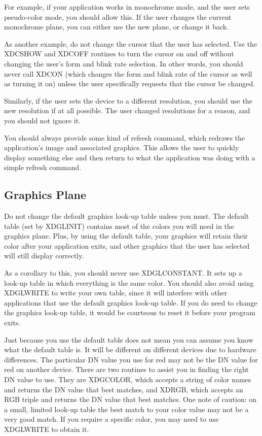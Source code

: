 For example, if your application works in monochrome mode, and the
user sets pseudo-color mode, you should allow this.  If the user changes
the current monochrome plane, you can either use the new plane, or
change it back.

As another example, do not change the cursor that the user has selected.
Use the XDCSHOW and XDCOFF routines to turn the cursor on and off
without changing the user's form and blink rate selection.  In other
words, you should never call XDCON (which changes the form and blink
rate of the cursor as well as turning it on) unless the user specifically
requests that the cursor be changed.

Similarly, if the user sets the device to a different resolution, you
should use the new resolution if at all possible.  The user
changed resolutions for a reason, and you should not ignore it.

You should always provide some kind of refresh command, which redraws the
application's image and associated graphics.  This allows the user to
quickly display something else and then return to what the application
was doing with a simple refresh command.
\subsection{Graphics Plane}
Do not change the default graphics look-up table unless you must.  The
default table (set by XDGLINIT) contains most of the colors you
will need in the graphics plane.  Plus, by using the default table,
your graphics will retain their color after your application exits, and
other graphics that the user has selected will still display correctly.

As a corollary to this, you should never use XDGLCONSTANT.  It sets up
a look-up table in which everything is the same color.  You should also
avoid using XDGLWRITE to write your own table, since
it will interfere with other applications that use the default graphics
look-up table.  If you do need to change the graphics look-up table,
it would be courteous to reset it before your program exits.

Just because you use the default table does not mean you can assume you
know what the default table is.  It will be different on different devices
due to hardware differences.  The particular DN value you use for red may
not be the DN value for red on another device.  There are two
routines to assist you in finding the right DN value to use.  They are
XDGCOLOR, which accepts a string of color names and returns the DN
value that best matches, and XDRGB, which accepts an RGB triple and
returns the DN value that best matches.  One note of caution:  on a
small, limited look-up table the best match to your color value may
not be a very good match.  If you require a specific color, you may
need to use XDGLWRITE to obtain it.
